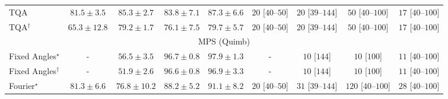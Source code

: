 \begin{tabular}{l|cccc|cccc|}
TQA & {\cellcolor[HTML]{8B65AE}} \color[HTML]{F1F1F1} $81.5\pm 3.5$ & {\cellcolor[HTML]{8949A1}} \color[HTML]{F1F1F1} $85.3\pm 2.7$ & {\cellcolor[HTML]{8A54A6}} \color[HTML]{F1F1F1} $83.8\pm 7.1$ & {\cellcolor[HTML]{873A98}} \color[HTML]{F1F1F1} $87.3\pm 6.6$ & {\cellcolor[HTML]{FFF4F0}} \color[HTML]{000000} $20$ [$40$--$50$] & {\cellcolor[HTML]{FFF4F0}} \color[HTML]{000000} $20$ [$39$--$144$] & {\cellcolor[HTML]{FEEDE9}} \color[HTML]{000000} $50$ [$40$--$100$] & {\cellcolor[HTML]{FFF5F1}} \color[HTML]{000000} $17$ [$40$--$100$] \\
TQA$^\dagger$ & {\cellcolor[HTML]{B4CCE2}} \color[HTML]{000000} $65.3\pm 12.8$ & {\cellcolor[HTML]{8C76B7}} \color[HTML]{F1F1F1} $79.2\pm 1.7$ & {\cellcolor[HTML]{8C8DC2}} \color[HTML]{F1F1F1} $76.1\pm 7.5$ & {\cellcolor[HTML]{8C72B5}} \color[HTML]{F1F1F1} $79.7\pm 5.7$ & {\cellcolor[HTML]{FFF4F0}} \color[HTML]{000000} $20$ [$40$--$50$] & {\cellcolor[HTML]{FFF4F0}} \color[HTML]{000000} $20$ [$39$--$144$] & {\cellcolor[HTML]{FEEDE9}} \color[HTML]{000000} $50$ [$40$--$100$] & {\cellcolor[HTML]{FFF5F1}} \color[HTML]{000000} $17$ [$40$--$100$] \\
\cline{1-9}
\multicolumn{9}{c}{\rule{0pt}{8pt}MPS (Quimb)} \\
\midrule
Fixed Angles$^\star$ & {\cellcolor[HTML]{000000}} \color[HTML]{F1F1F1} {\cellcolor{white}} \color{black} - & {\cellcolor[HTML]{FFF9C5}} \color[HTML]{000000} $56.5\pm 3.5$ & {\cellcolor[HTML]{712806}} \color[HTML]{F1F1F1} $96.7\pm 0.8$ & {\cellcolor[HTML]{662506}} \color[HTML]{F1F1F1} $97.9\pm 1.3$ & {\cellcolor[HTML]{000000}} \color[HTML]{F1F1F1} {\cellcolor{white}} \color{black} - & {\cellcolor[HTML]{FFF7F3}} \color[HTML]{000000} $10$ [$144$] & {\cellcolor[HTML]{FFF7F3}} \color[HTML]{000000} $10$ [$100$] & {\cellcolor[HTML]{FFF6F2}} \color[HTML]{000000} $11$ [$40$--$100$] \\
Fixed Angles$^\dagger$ & {\cellcolor[HTML]{000000}} \color[HTML]{F1F1F1} {\cellcolor{white}} \color{black} - & {\cellcolor[HTML]{FFFFE5}} \color[HTML]{000000} $51.9\pm 2.6$ & {\cellcolor[HTML]{712806}} \color[HTML]{F1F1F1} $96.6\pm 0.8$ & {\cellcolor[HTML]{702806}} \color[HTML]{F1F1F1} $96.9\pm 3.3$ & {\cellcolor[HTML]{000000}} \color[HTML]{F1F1F1} {\cellcolor{white}} \color{black} - & {\cellcolor[HTML]{FFF7F3}} \color[HTML]{000000} $10$ [$144$] & {\cellcolor[HTML]{FFF7F3}} \color[HTML]{000000} $10$ [$100$] & {\cellcolor[HTML]{FFF6F2}} \color[HTML]{000000} $11$ [$40$--$100$] \\
Fourier$^\star$ & {\cellcolor[HTML]{E86C12}} \color[HTML]{F1F1F1} $81.3\pm 6.6$ & {\cellcolor[HTML]{F88B22}} \color[HTML]{F1F1F1} $76.8\pm 10.2$ & {\cellcolor[HTML]{BC4503}} \color[HTML]{F1F1F1} $88.2\pm 5.2$ & {\cellcolor[HTML]{A33904}} \color[HTML]{F1F1F1} $91.1\pm 8.2$ & {\cellcolor[HTML]{FFF4F0}} \color[HTML]{000000} $20$ [$40$--$50$] & {\cellcolor[HTML]{FFF2EE}} \color[HTML]{000000} $31$ [$39$--$144$] & {\cellcolor[HTML]{FDDCD8}} \color[HTML]{000000} $120$ [$40$--$100$] & {\cellcolor[HTML]{FFF3EF}} \color[HTML]{000000} $28$ [$40$--$100$] \\

\end{tabular}
